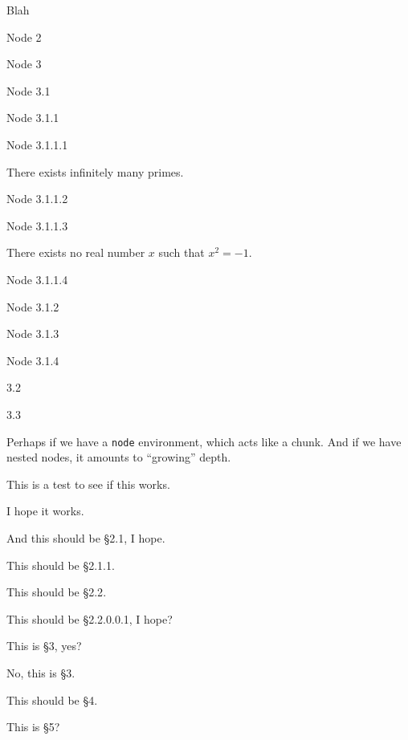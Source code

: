 \begin{node} %
  Blah
\end{node}
\begin{node} %
  Node 2
\end{node}
\begin{node}
  Node 3
  \begin{node}
    Node 3.1
    \begin{node}
      Node 3.1.1
      \begin{node}[Proposition]%
Node 3.1.1.1
      \end{node}
      \begin{theorem}[Euclid]
There exists infinitely many primes.
      \end{theorem}
      \begin{node}
        Node 3.1.1.2
      \end{node}
      \begin{node}
        Node 3.1.1.3
      \end{node}
      \begin{theorem}
There exists no real number $x$ such that $x^{2}=-1$.
      \end{theorem}
      \begin{node}
        Node 3.1.1.4
      \end{node}
    \end{node}
    \begin{node}
      Node 3.1.2
    \end{node}
    \begin{node}
      Node 3.1.3
    \end{node}
    \begin{node}
      Node 3.1.4
    \end{node}
  \end{node}
  \begin{node}
    3.2
  \end{node}
  \begin{node}
    3.3
  \end{node}
\end{node}


\M
Perhaps if we have a \verb#node# environment, which acts like a
chunk. And if we have nested nodes, it amounts to ``growing'' depth. 

\M
This is a test to see if this works. \lipsum[2-4]

\M I hope it works. \lipsum[1-3]

\M[1]
And this should be \S{2.1}, I hope. \lipsum[4-5]

 This should be \S{2.1.1}.

\M[-1]
This should be \S{2.2}.

\M[3]
This should be \S{2.2.0.0.1}, I hope?

%
This is \S3, yes?

\M[-1]
No, this is \S3.

\M[0] This should be \S4.

 This is \S5?



